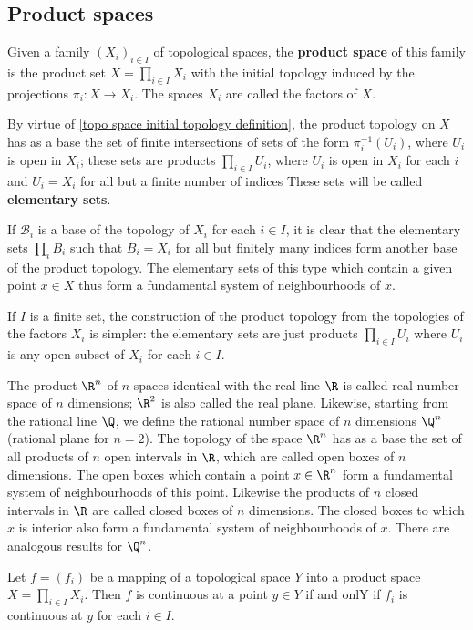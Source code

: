 \subsection{Product spaces}
\begin{definition}
Given a family $(X_i)_{i\in I}$ of topological spaces, the \textbf{product space} of this family is the product set $X=\prod_{i\in I}X_i$ with the initial topology induced by the projections $\pi_i:X\to X_i$. The spaces $X_i$ are called the factors of $X$.
\end{definition}
By virtue of \cref{topo space initial topology definition}, the product topology on $X$ has as a base the set of finite intersections of sets of the form $\pi_i^{-1}(U_i)$, where $U_i$ is open in $X_i$; these sets are products $\prod_{i\in I}U_i$, where $U_i$ is open in $X_i$ for each $i$ and $U_i=X_i$ for all but a finite number of indices These sets will be called \textbf{elementary sets}.\par
If $\mathcal{B}_i$ is a base of the topology of $X_i$ for each $i\in I$, it is clear that the elementary sets $\prod_iB_i$ such that $B_i=X_i$ for all but finitely many indices form another base of the product topology. The elementary sets of this type which contain a given point $x\in X$ thus form a fundamental system of neighbourhoods of $x$.\par
If $I$ is a finite set, the construction of the product topology from the topologies of the factors $X_i$ is simpler: the elementary sets are just products $\prod_{i\in I}U_i$ where $U_i$ is any open subset of $X_i$ for each $i\in I$.
\begin{example}
The product $\R^n$ of $n$ spaces identical with the real line $\R$ is called real number space of $n$ dimensions; $\R^2$ is also called the real plane. Likewise, starting from the rational line $\Q$, we define the rational number space of $n$ dimensions $\Q^n$ (rational plane for $n=2$). The topology of the space $\R^n$ has as a base the set of all products of $n$ open intervals in $\R$, which are called open boxes of $n$ dimensions. The open boxes which contain a point $x\in\R^n$ form a fundamental system of neighbourhoods of this point. Likewise the products of $n$ closed intervals in $\R$ are called closed boxes of $n$ dimensions. The closed boxes to which $x$ is interior also form a fundamental system of neighbourhoods of $x$. There are analogous results for $\Q^n$.
\end{example}
\begin{proposition}\label{topo space map into product continuous iff}
Let $f=(f_i)$ be a mapping of a topological space $Y$ into a product space $X=\prod_{i\in I}X_i$. Then $f$ is continuous at a point $y\in Y$ if and onlY if $f_i$ is continuous at $y$ for each $i\in I$.
\end{proposition}
